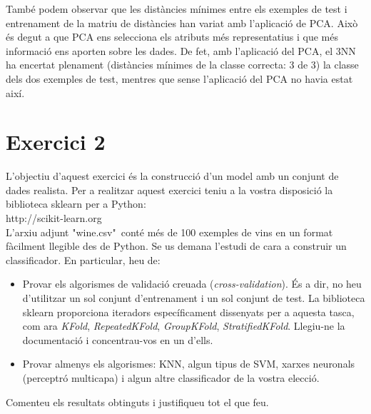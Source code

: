 \documentclass{article} %
\begin{document}
{	També podem observar que les distàncies mínimes entre els exemples de test i entrenament de la matriu de distàncies han variat amb l'aplicació de PCA. Això és degut a que PCA ens selecciona els atributs més representatius i que més informació ens aporten sobre les dades. De fet, amb l'aplicació del PCA, el 3NN ha encertat plenament (distàncies mínimes de la classe correcta: 3 de 3) la classe dels dos exemples de test, mentres que sense l'aplicació del PCA no havia estat així. \\
}


\section{Exercici 2}
L'objectiu d'aquest exercici és la construcció d'un model amb un conjunt de dades realista. Per a realitzar aquest exercici teniu a la vostra disposició la biblioteca sklearn per a Python: \\

http://scikit-learn.org \\

L'arxiu adjunt "wine.csv"\ conté més de 100 exemples de vins en un format fàcilment llegible des de Python. Se us demana l'estudi de cara a construir un classificador. En particular, heu de:
\begin{itemize}
	\item Provar els algorismes de validació creuada (\textit{cross-validation}). És a dir, no heu d'utilitzar un sol conjunt d'entrenament i un sol conjunt de test. La biblioteca sklearn proporciona iteradors específicament dissenyats per a aquesta tasca, com ara \textit{KFold}, \textit{RepeatedKFold}, \textit{GroupKFold}, \textit{StratifiedKFold}. Llegiu-ne la documentació i concentrau-vos en un d'ells.
	\item Provar almenys els algorismes: KNN, algun tipus de SVM, xarxes neuronals (perceptró multicapa) i algun altre classificador de la vostra elecció.
\end{itemize}
Comenteu els resultats obtinguts i justifiqueu tot el que feu.
\\
\end{document}
